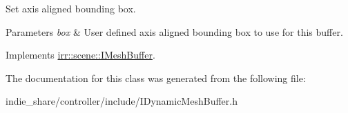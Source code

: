 Set axis aligned bounding box. 


\begin{DoxyParams}{Parameters}
{\em box} & User defined axis aligned bounding box to use for this buffer. \\
\hline
\end{DoxyParams}


Implements \hyperlink{classirr_1_1scene_1_1IMeshBuffer_adbbfb7757dfbba7357193d2280893df6}{irr\+::scene\+::\+I\+Mesh\+Buffer}.



The documentation for this class was generated from the following file\+:\begin{DoxyCompactItemize}
\item 
indie\+\_\+share/controller/include/I\+Dynamic\+Mesh\+Buffer.\+h\end{DoxyCompactItemize}

